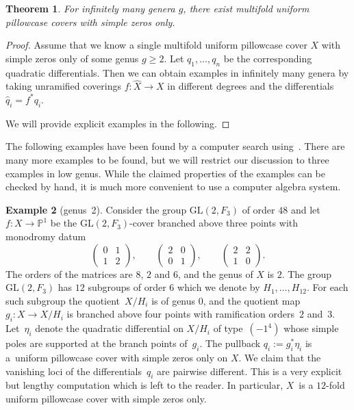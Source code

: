 \documentclass[10pt,a4paper]{amsart}
\numberwithin{equation}{section}
\newtheorem{theo}{Theorem}[section]
\theoremstyle{definition}
\newtheorem{exam}[theo]{Example}
\renewcommand{\to}{\rightarrow}
\newcommand{\PP}{\mathbb{P}}
\newcommand{\GL}{\mathrm{GL}}
\begin{document}
\begin{theo}\label{theo:multifold_pillow}
	For infinitely many genera $g$, there exist multifold uniform pillowcase covers with simple zeros only.
\end{theo}
\begin{proof}
	Assume that we know a single multifold uniform pillowcase cover $X$ with simple zeros only of some genus $g \geq 2$.
	Let $q_1, \dots, q_n$ be the corresponding quadratic differentials.
	Then we can obtain examples in infinitely many genera by taking unramified coverings $f\colon \widehat X \to X$ in different degrees and the differentials $\widehat q_i = f^* q_i$.

We will provide explicit examples in the following.
\end{proof}

The following examples have been found by a computer search using~\cite{GAP4}. There are many more examples to be found, but we will restrict our discussion to three examples in low genus.
While the claimed properties of the examples can be checked by hand, it is much more convenient to use a computer algebra system.

\begin{exam}[genus~2]
Consider the group $\GL(2,F_3)$ of order $48$ and let $f\colon X\to \PP^1$ be the $\GL(2, F_3)$-cover branched above three points with monodromy datum
\[
	\begin{pmatrix}0&1\\1&2\end{pmatrix}, \qquad
	\begin{pmatrix}2&0\\0&1\end{pmatrix}, \qquad
	\begin{pmatrix}2&2\\1&0\end{pmatrix}.
\]
The orders of the matrices are $8$, $2$ and $6$, and the genus of $X$ is $2$.
The group $\GL(2,F_3)$ has $12$ subgroups of order $6$ which we denote by $H_1, \dots, H_{12}$.
For each such subgroup the quotient~$X/H_i$ is of genus $0$, and the quotient map $g_i\colon X \to X/H_i$ is branched above four points with ramification orders~$2$ and~$3$.
Let~$\eta_i$ denote the quadratic differential on $X/H_i$ of type~$(-1^4)$ whose simple poles are supported at the branch points of~$g_i$.
The pullback $q_i := g_i^*\eta_i$ is a~uniform pillowcase cover with simple zeros only on $X$.
We claim that the vanishing loci of the differentials~$q_i$ are pairwise different. This is a very explicit but lengthy computation which is left to the reader.
In particular, $X$~is a $12$-fold uniform pillowcase cover with simple zeros only. 	
\end{exam}
\end{document}
